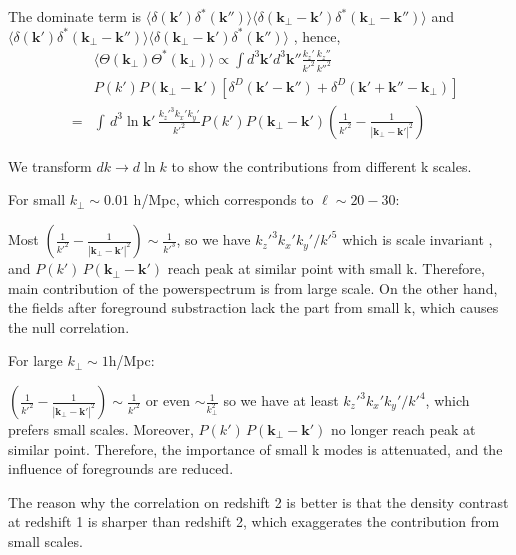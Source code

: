 The dominate term is 
$
    \langle \delta(\bm{k}')\delta^\ast(\bm{k}'') \rangle
    \langle \delta({\bm{k}}_\perp-\bm{k}')
    \delta^\ast({\bm{k}}_\perp-\bm{k}'')\rangle
$ and 
$
    \langle \delta(\bm{k}')
    \delta^\ast({\bm{k}}_\perp-\bm{k}'')\rangle
    \langle \delta({\bm{k}}_\perp-\bm{k}')
    \delta^\ast(\bm{k}'') \rangle
$
, hence, 
\begin{eqnarray}
    &&\langle\Theta({\bm{k}}_\perp)\Theta^{\ast}({\bm{k}}_\perp)\rangle
    \propto\int d^3 \bm{k}'d^3 \bm{k}''
    \frac{k_z'}{k'^2}\frac{k_z''}{k''^{2}}
    \\
    &&P(k')P({\bm{k}}_\perp-\bm{k}')
    [\delta^D(\bm{k}'-\bm{k}'')+\delta^D(\bm{k}'+\bm{k}''-{\bm{k}}_\perp)]\nonumber\\
    &=&\int\, d^3\ln \bm{k}'\, \frac{k_z'^3k_x'k_y'}{k'^2}
    P(k')P({\bm{k}}_\perp-\bm{k}')
    (\frac{1}{k'^2}-\frac{1}{|{\bm{k}}_\perp-\bm{k}'|^2})\nonumber
\end{eqnarray}

    We transform $dk\rightarrow d\ln k$ 
    to show the contributions from different k scales.

    For small ${k}_\perp \sim 0.01$ h/Mpc, 
    which corresponds to $\ell \sim 20-30$:
    
  Most $ (\frac{1}{k'^2}-\frac{1}{|{\bm{k}}_\perp-\bm{k}'|^2})
   \sim \frac{1}{k'^3}$, 
   so we have $k_z'^3k_x'k_y'/k'^5$ which is scale invariant
   , and 
   $ P(k')\,P({\bm{k}}_\perp-\bm{k}')$
   reach peak at similar point with small k. 
   Therefore, main contribution of the powerspectrum is from large scale.
On the other hand, the fields after foreground substraction lack the part from small k, which causes the null correlation.

For large ${k}_\perp\sim 1$h/Mpc:

   $ (\frac{1}{k'^2}-\frac{1}{|{\bm{k}}_\perp-\bm{k}'|^2})
   \sim \frac{1}{k'^2}$ or even $\sim \frac{1}{{k}_\perp^2}$
   so we have at least $k_z'^3k_x'k_y'/k'^4$, which prefers small scales.
   Moreover, $ P(k')\,P({\bm{k}}_\perp-\bm{k}')$
   no longer reach peak at similar point. 
Therefore, the importance of small k modes is attenuated, 
and the influence of foregrounds are reduced.

The reason why the correlation on redshift 2 is better is that 
the density contrast at redshift 1 is sharper than redshift 2, 
which exaggerates the contribution from small scales.
